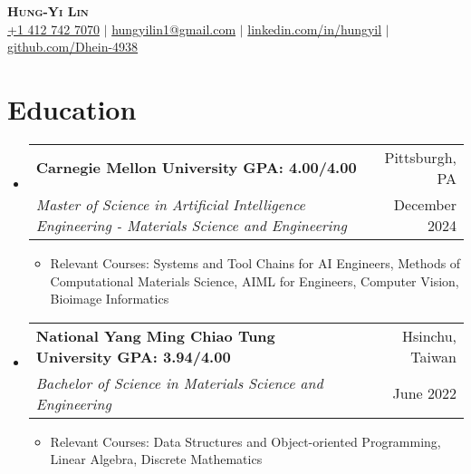 \documentclass[a4paper,11pt]{article}
\makeatletter
\newcommand{\resumeItem}[1]{
  \item\small{
    {#1 \vspace{-0pt}}
  }
}
\newcommand{\resumeDoubleHeading}[4]{
  \vspace{-2pt}\item
    \begin{tabular*}{0.97\textwidth}[t]{l@{\extracolsep{\fill}}r}
        \textbf{#1} & #2 \\
        \textit{\small#3} & {\small #4} \\
    \end{tabular*}\vspace{-5pt}
}
\newcommand{\resumeSubHeadingListStart}{\begin{itemize}[leftmargin=0.15in, label={}]}
\newcommand{\resumeSubHeadingListEnd}{\end{itemize}}
\makeatother
\begin{document}

\begin{center}
    \textbf{\Huge \scshape Hung-Yi Lin} \\ \vspace{3pt}
    \small
    \faMobile \hspace{.5pt} \href{tel:14127427070}{+1 412 742 7070}
    $|$
    \faAt \hspace{.5pt} \href{mailto:hungyilin1@gmail.com}{hungyilin1@gmail.com}
    $|$
    \faLinkedinSquare \hspace{.5pt} \href{https://www.linkedin.com/in/hungyil}{linkedin.com/in/hungyil}
    $|$
    \faGithub \hspace{.5pt} \href{https://github.com/Dhein-4938}{github.com/Dhein-4938}
\end{center}



\section{Education}
\vspace{3pt}
\resumeSubHeadingListStart
    \resumeDoubleHeading
      {Carnegie Mellon University \textnormal{\small GPA: 4.00/4.00}}{Pittsburgh, PA}
      {Master of Science in Artificial Intelligence Engineering - Materials Science and Engineering}{December 2024}
    \resumeSubHeadingListStart
        \resumeItem{Relevant Courses: Systems and Tool Chains for AI Engineers, Methods of Computational Materials Science, AIML for Engineers, Computer Vision, Bioimage Informatics}
    \resumeSubHeadingListEnd
    \resumeDoubleHeading
      {National Yang Ming Chiao Tung University  \textnormal{\small GPA: 3.94/4.00}}{Hsinchu, Taiwan}
      {Bachelor of Science in Materials Science and Engineering}{June 2022}
    \resumeSubHeadingListStart
        \resumeItem{Relevant Courses: Data Structures and Object-oriented Programming, Linear Algebra, Discrete Mathematics}
    \resumeSubHeadingListEnd   
\resumeSubHeadingListEnd

\end{document}
